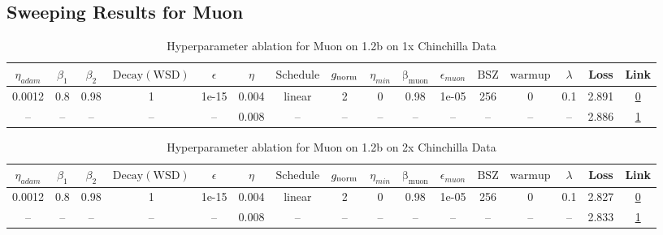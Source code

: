 \subsection{Sweeping Results for Muon}%
\begin{table}[H]
\centering
\caption{Hyperparameter ablation for Muon on 1.2b on 1x Chinchilla Data}
\label{tab:ablation_muon_1.2b_on_1x_chinchilla_data}
\begin{tabular}{cccccccccccccccc}
\toprule
$\eta_{adam}$ & $\beta_1$ & $\beta_2$ & $\mathrm{Decay (WSD)}$ & $\epsilon$ & $\eta$ & $\mathrm{Schedule}$ & $g_{\mathrm{norm}}$ & $\eta_{min}$ & $\mathrm{\beta_{muon}}$ & $\epsilon_{muon}$ & $\mathrm{BSZ}$ & $\mathrm{warmup}$ & $\lambda$ & Loss & Link \\
\midrule
0.0012 & 0.8 & 0.98 & 1 & 1e-15 & 0.004 & linear & 2 & 0 & 0.98 & 1e-05 & 256 & 0 & 0.1 & 2.891 & \href{https://wandb.ai/marin-community/optimizer-scaling/runs/sweep-1.2b-24B-muon42df73lr0.004-wd0.1-minlr0.0-warmup0.0-b10.8--70a4b4}{0} \\
\midrule
-- & -- & -- & -- & -- & 0.008 & -- & -- & -- & -- & -- & -- & -- & -- & 2.886 & \href{https://wandb.ai/marin-community/optimizer-scaling/runs/sweep-1.2b-24B-muonw84ef30lr0.008-wd0.1-minlr0.0-warmup0.0-b10.8-5ee5b3}{1} \\
\bottomrule
\end{tabular}
\end{table}

\begin{table}[H]
\centering
\caption{Hyperparameter ablation for Muon on 1.2b on 2x Chinchilla Data}
\label{tab:ablation_muon_1.2b_on_2x_chinchilla_data}
\begin{tabular}{cccccccccccccccc}
\toprule
$\eta_{adam}$ & $\beta_1$ & $\beta_2$ & $\mathrm{Decay (WSD)}$ & $\epsilon$ & $\eta$ & $\mathrm{Schedule}$ & $g_{\mathrm{norm}}$ & $\eta_{min}$ & $\mathrm{\beta_{muon}}$ & $\epsilon_{muon}$ & $\mathrm{BSZ}$ & $\mathrm{warmup}$ & $\lambda$ & Loss & Link \\
\midrule
0.0012 & 0.8 & 0.98 & 1 & 1e-15 & 0.004 & linear & 2 & 0 & 0.98 & 1e-05 & 256 & 0 & 0.1 & 2.827 & \href{https://wandb.ai/marin-community/optimizer-scaling/runs/sweep-1.2b-48B-muon09cdeclr0.004-wd0.1-minlr0.0-warmup0.0-b10.8--4f2850}{0} \\
\midrule
-- & -- & -- & -- & -- & 0.008 & -- & -- & -- & -- & -- & -- & -- & -- & 2.833 & \href{https://wandb.ai/marin-community/optimizer-scaling/runs/sweep-1.2b-48B-muonforce3466c6lr0.008-wd0.1-minlr0.0-warmup0.0-b-6cf36e}{1} \\
\bottomrule
\end{tabular}
\end{table}

